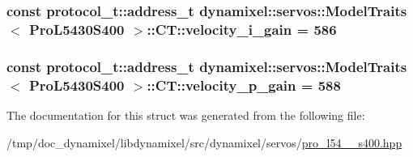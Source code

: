 \subsubsection[{velocity\+\_\+i\+\_\+gain}]{\setlength{\rightskip}{0pt plus 5cm}const {\bf protocol\+\_\+t\+::address\+\_\+t} {\bf dynamixel\+::servos\+::\+Model\+Traits}$<$ {\bf Pro\+L5430\+S400} $>$\+::C\+T\+::velocity\+\_\+i\+\_\+gain = 586\hspace{0.3cm}{\ttfamily [static]}}\label{structdynamixel_1_1servos_1_1_model_traits_3_01_pro_l5430_s400_01_4_1_1_c_t_ac5d0ddb677dcca548851c3d8884d6573}
\hypertarget{structdynamixel_1_1servos_1_1_model_traits_3_01_pro_l5430_s400_01_4_1_1_c_t_a8b2a7d2b0c9a3ab799b06a18dbbf3820}{}
\subsubsection[{velocity\+\_\+p\+\_\+gain}]{\setlength{\rightskip}{0pt plus 5cm}const {\bf protocol\+\_\+t\+::address\+\_\+t} {\bf dynamixel\+::servos\+::\+Model\+Traits}$<$ {\bf Pro\+L5430\+S400} $>$\+::C\+T\+::velocity\+\_\+p\+\_\+gain = 588\hspace{0.3cm}{\ttfamily [static]}}\label{structdynamixel_1_1servos_1_1_model_traits_3_01_pro_l5430_s400_01_4_1_1_c_t_a8b2a7d2b0c9a3ab799b06a18dbbf3820}


The documentation for this struct was generated from the following file\+:\begin{DoxyCompactItemize}
\item 
/tmp/doc\+\_\+dynamixel/libdynamixel/src/dynamixel/servos/\hyperlink{pro__l54__30__s400_8hpp}{pro\+\_\+l54\+\_\+\_\+s400.\+hpp}\end{DoxyCompactItemize}
